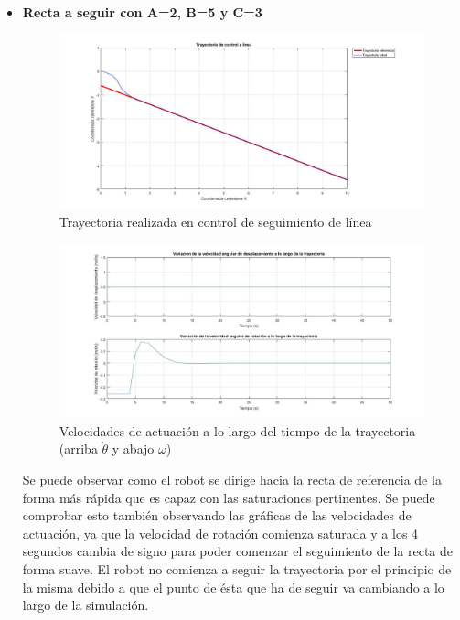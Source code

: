 \documentclass[a4paper,twoside]{article}
\begin{document}
	\begin{itemize}
		\item \textbf{Recta a seguir con A=2, B=5 y C=3}
		\begin{figure}[H]
			\centering
			\includegraphics[width=1\textwidth]{control_linea_1}
			\caption{Trayectoria realizada en control de seguimiento de línea}
		\end{figure}
		\begin{figure}[H]
			\centering
			\includegraphics[width=1\textwidth]{control_linea_1_2}
			\caption{Velocidades de actuación a lo largo del tiempo de la trayectoria (arriba $\dot{\theta}$ y abajo $\omega$)}
		\end{figure}
	Se puede observar como el robot se dirige hacia la recta de referencia de la forma más rápida que es capaz con las saturaciones pertinentes. Se puede comprobar esto también observando las gráficas de las velocidades de actuación, ya que la velocidad de rotación comienza saturada y a los 4 segundos cambia de signo para poder comenzar el seguimiento de la recta de forma suave. El robot no comienza a seguir la trayectoria por el principio de la misma debido a que el punto de ésta que ha de seguir va cambiando a lo largo de la simulación.\\
	

\end{itemize}
\end{document}
